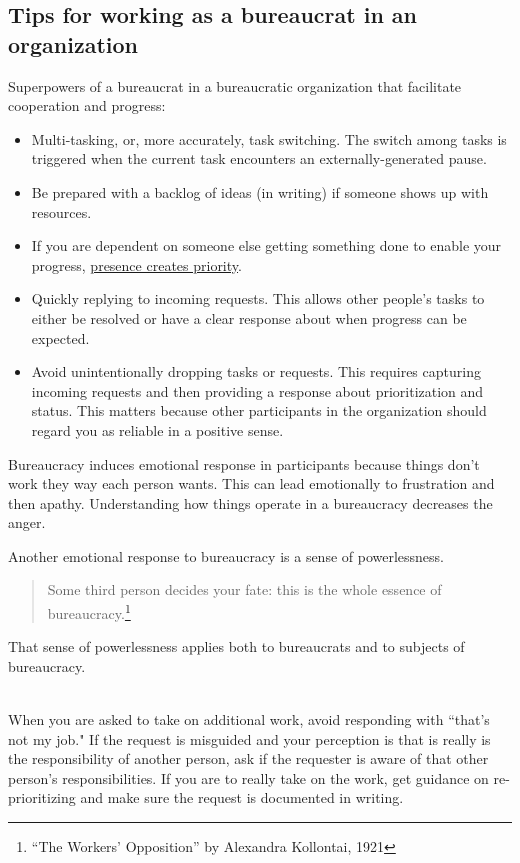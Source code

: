 \subsection{Tips for working as a bureaucrat in an organization}

Superpowers of a bureaucrat in a bureaucratic organization that facilitate cooperation and progress:
\begin{itemize}
    \item Multi-tasking, or, more accurately, task switching. The switch among tasks is triggered when the current task encounters an externally-generated pause. 
    \item Be prepared with a backlog of ideas (in writing) if someone shows up with resources.
    \item If you are dependent on someone else getting something done to enable your progress, \underline{presence creates priority}.
    \item Quickly replying to incoming requests. This allows other people's tasks to either be resolved or have a clear response about when progress can be expected. 
    \item Avoid unintentionally dropping tasks or requests. This requires capturing incoming requests and then providing a response about prioritization and status. This matters because other participants in the organization should regard you as reliable in a positive sense. 
\end{itemize}

Bureaucracy induces emotional response in participants because things don't work they way each person wants. This can lead emotionally to frustration and then apathy. Understanding how things operate in a bureaucracy decreases the anger.


Another emotional response to bureaucracy is a sense of powerlessness. 
\begin{quote}
Some third person decides your fate: this is the whole essence of bureaucracy.\footnote{``The Workers' Opposition'' by Alexandra Kollontai, 1921}
\end{quote}
That sense of powerlessness applies both to bureaucrats and to subjects of bureaucracy. 


\ \\

When you are asked to take on additional work, avoid responding with ``that's not my job." If the request is misguided and your perception is that is really is the responsibility of another person, ask if the requester is aware of that other person's responsibilities. If you are to really take on the work, get guidance on re-prioritizing and make sure the request is documented in writing. 

